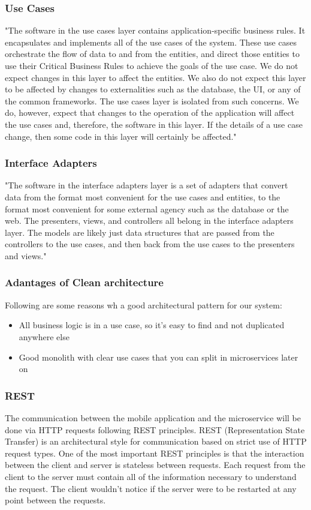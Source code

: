 \subsubsection{Use Cases}
"The software in the use cases layer contains application-specific business rules. It encapsulates and implements all of the use cases of the system. These use cases orchestrate the flow of data to and from the entities, and direct those entities to use their Critical Business Rules to achieve the goals of the use case.
We do not expect changes in this layer to affect the entities. We also do not expect this layer to be affected by changes to externalities such as the database, the UI, or any of the common frameworks. The use cases layer is isolated from such concerns.
We do, however, expect that changes to the operation of the application will affect the use cases and, therefore, the software in this layer. If the details of a use case change, then some code in this layer will certainly be affected." \cite{clean}

\subsubsection{Interface Adapters}
"The software in the interface adapters layer is a set of adapters that convert data from the format most convenient for the use cases and entities, to the format most convenient for some external agency such as the database or
the web. The presenters, views, and controllers all belong in the interface adapters layer. The models are likely just data structures that are passed from the controllers to the use cases, and then back from the use cases to the presenters and views." \cite{clean}

\subsubsection{Adantages of Clean architecture}
Following are some reasons wh a good architectural pattern for our system:
\begin{itemize}
  \item All business logic is in a use case, so it’s easy to find and not duplicated anywhere else
  \item Good monolith with clear use cases that you can split in microservices later on

\end{itemize}


\subsubsection{REST}
The communication between the mobile application and the microservice will be done via HTTP requests following REST principles. REST (Representation State Transfer) is an architectural style for communication based on strict use of HTTP request types. One of the most important REST principles is that the interaction between the client and server is stateless between requests. Each request from the client to the server must contain all of the information necessary to understand the request. The client wouldn’t notice if the server were to be restarted at any point between the requests.


